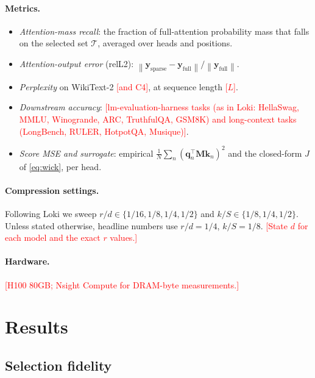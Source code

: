 \documentclass[10pt]{article}
\newcommand{\TODO}[1]{\textcolor{red}{[#1]}}
\newcommand{\norm}[1]{\left\lVert #1 \right\rVert}
\newcommand{\bq}{\mathbf{q}}
\newcommand{\bk}{\mathbf{k}}
\newcommand{\bM}{\mathbf{M}}
\theoremstyle{plain}
\theoremstyle{definition}
\theoremstyle{remark}
\begin{document}
\paragraph{Metrics.}
\begin{itemize}[leftmargin=*,itemsep=1pt]
  \item \emph{Attention-mass recall}: the fraction of full-attention
  probability mass that falls on the selected set $\mathcal{T}$, averaged
  over heads and positions.
  \item \emph{Attention-output error} (relL2):
  $\norm{\mathbf{y}_{\mathrm{sparse}}-\mathbf{y}_{\mathrm{full}}}/\norm{\mathbf{y}_{\mathrm{full}}}$.
  \item \emph{Perplexity} on WikiText-2 \TODO{and C4}, at sequence length
  \TODO{$L$}.
  \item \emph{Downstream accuracy}: \TODO{lm-evaluation-harness tasks (as in
  Loki: HellaSwag, MMLU, Winogrande, ARC, TruthfulQA, GSM8K) and long-context
  tasks (LongBench, RULER, HotpotQA, Musique)}.
  \item \emph{Score MSE and surrogate}: empirical $\frac1N\sum_n(\bq_n^\top\bM\bk_n)^2$
  and the closed-form $J$ of \eqref{eq:wick}, per head.
\end{itemize}

\paragraph{Compression settings.}
Following Loki we sweep $r/d\in\{1/16,1/8,1/4,1/2\}$ and
$k/S\in\{1/8,1/4,1/2\}$. Unless stated otherwise, headline numbers use
$r/d=1/4$, $k/S=1/8$. \TODO{State $d$ for each model and the exact $r$ values.}

\paragraph{Hardware.}
\TODO{H100 80GB; Nsight Compute for DRAM-byte measurements.}

\section{Results}
\label{sec:results}

\subsection{Selection fidelity}
\end{document}
